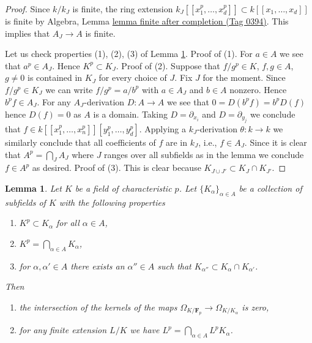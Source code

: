 \documentclass{amsart}
\theoremstyle{plain}
\newtheorem{lemma}[subsection]{Lemma}
\theoremstyle{definition}
\theoremstyle{remark}
\numberwithin{equation}{subsection}
\begin{document}
\begin{proof}
Since $k/k_J$ is finite, the ring extension
$k_J[[x_1^p, \ldots, x_d^p]] \subset k[[x_1, \ldots, x_d]]$ is finite
by Algebra, Lemma \href{https://stacks.math.columbia.edu/tag/0394}{lemma finite after completion (Tag 0394)}.
This implies that $A_J \to A$ is finite.

\medskip\noindent
Let us check properties (1), (2), (3) of
Lemma \ref{lemma-intersection-subfields}.
Proof of (1). For $a \in A$ we see that $a^p \in A_J$.
Hence $K^p \subset K_J$. Proof of (2).
Suppose that $f/g^p \in K$, $f, g \in A$, $g \not = 0$
is contained in $K_J$ for every choice of $J$.
Fix $J$ for the moment. Since $f/g^p \in K_J$ we can write
$f/g^p = a/b^p$ with $a \in A_J$ and $b \in A$ nonzero.
Hence $b^p f \in A_J$. For any $A_J$-derivation $D : A \to A$ we see
that $0 = D(b^pf) = b^p D(f)$ hence $D(f) = 0$ as $A$ is a domain.
Taking $D = \partial_{x_i}$ and $D = \partial_{y_j}$ we conclude
that $f \in k[[x_1^p, \ldots, x_n^p]][y_1^p, \ldots, y_d^p]$.
Applying a $k_J$-derivation $\theta : k \to k$
we similarly conclude that all coefficients of $f$
are in $k_J$, i.e., $f \in A_J$. Since it is clear that
$A^p = \bigcap\nolimits_J A_J$ where $J$ ranges over all subfields
as in the lemma we conclude $f \in A^p$ as desired.
Proof of (3). This is clear because $K_{J \cup J'} \subset K_J \cap K_{J'}$.
\end{proof}


\begin{lemma}
\label{lemma-intersection-subfields}
Let $K$ be a field of characteristic $p$. Let $\{K_\alpha\}_{\alpha \in A}$
be a collection of subfields of $K$ with the following properties
\begin{enumerate}
\item $K^p \subset K_\alpha$ for all $\alpha \in A$,
\item $K^p = \bigcap_{\alpha \in A} K_\alpha$,
\item for $\alpha, \alpha' \in A$ there exists an $\alpha'' \in A$
such that $K_{\alpha''} \subset K_\alpha \cap K_{\alpha'}$.
\end{enumerate}
Then
\begin{enumerate}
\item the intersection of the kernels of the maps
$\Omega_{K/\mathbf{F}_p} \to \Omega_{K/K_\alpha}$ is zero,
\item for any finite extension $L/K$ we have
$L^p = \bigcap_{\alpha \in A} L^pK_\alpha$.
\end{enumerate}
\end{lemma}
\end{document}
